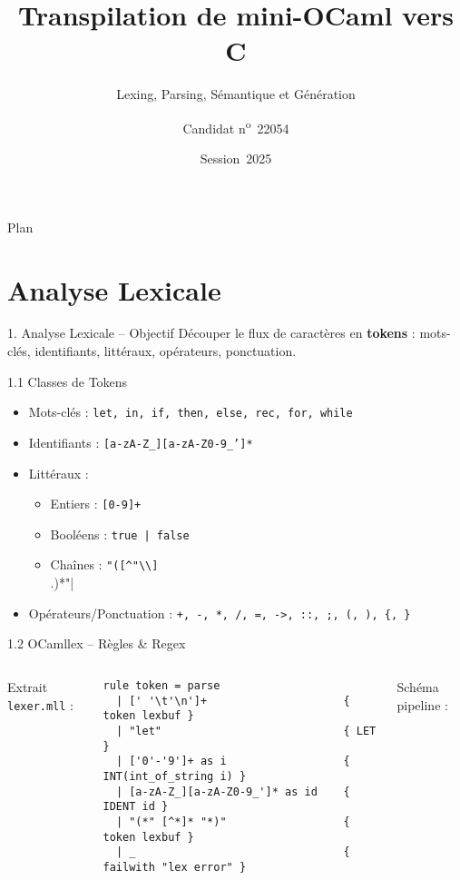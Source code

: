 \documentclass[aspectratio=43]{beamer}
\title{Transpilation de mini-OCaml vers C}
\subtitle{Lexing, Parsing, Sémantique et Génération}
\author{Candidat n\textsuperscript{o}~22054}
\institute{CPGE -- TIPE Informatique}
\date{Session~2025}
\begin{document}
\begin{frame}[plain]
  \titlepage
\end{frame}

\begin{frame}{Plan}
  \tableofcontents
\end{frame}

\section{Analyse Lexicale}
\begin{frame}{1. Analyse Lexicale – Objectif}
Découper le flux de caractères en \textbf{tokens} : mots-clés, identifiants, littéraux, opérateurs, ponctuation.
\end{frame}

\begin{frame}{1.1 Classes de Tokens}
\begin{itemize}
  \item Mots-clés : \texttt{let, in, if, then, else, rec, for, while}
  \item Identifiants : \texttt{[a-zA-Z\_][a-zA-Z0-9\_']*}
  \item Littéraux :
    \begin{itemize}
      \item Entiers : \texttt{[0-9]+}
      \item Booléens : \texttt{true | false}
      \item Chaînes : \verb|"([^"\\]|\\.)*"|
    \end{itemize}
  \item Opérateurs/Ponctuation : \texttt{+, -, *, /, =, ->, ::, ;, (, ), \{, \}}
\end{itemize}
\end{frame}

\begin{frame}[fragile]{1.2 OCamllex – Règles & Regex}
\begin{columns}
Extrait \texttt{lexer.mll} :
\begin{lstlisting}[style=ocaml]
rule token = parse
  | [' '\t'\n']+                     { token lexbuf }
  | "let"                            { LET }
  | ['0'-'9']+ as i                  { INT(int_of_string i) }
  | [a-zA-Z_][a-zA-Z0-9_']* as id    { IDENT id }
  | "(*" [^*]* "*)"                  { token lexbuf }
  | _                                { failwith "lex error" }
\end{lstlisting}
Schéma pipeline :
\end{columns}
\end{frame}
\end{document}
